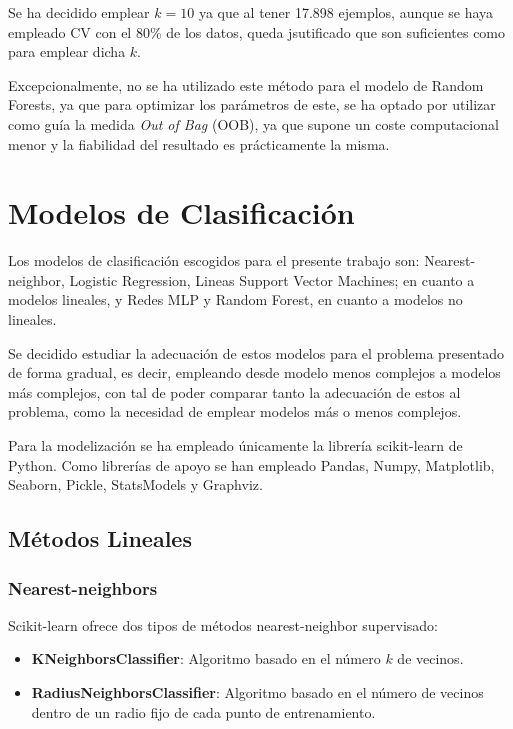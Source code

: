 \documentclass[a4paper]{article} %
\begin{document}
Se ha decidido emplear $k = 10$ ya que al tener 17.898 ejemplos, aunque se haya empleado CV con el 80\% de los datos, queda jsutificado que son suficientes como para emplear dicha $k$.\vspace{5mm}

Excepcionalmente, no se ha utilizado este método para el modelo de Random Forests, ya que para optimizar los parámetros de este, se ha optado por utilizar como guía la medida \textit{Out of Bag} (OOB), ya que supone un coste computacional menor y la fiabilidad del resultado es prácticamente la misma. 


\section{Modelos de Clasificación}

Los modelos de clasificación escogidos para el presente trabajo son: Nearest-neighbor, Logistic Regression, Lineas Support Vector Machines; en cuanto a modelos lineales, y Redes MLP y Random Forest, en cuanto a modelos no lineales.\vspace{5mm}

Se decidido estudiar la adecuación de estos modelos para el problema presentado de forma gradual, es decir, empleando desde modelo menos complejos a modelos más complejos, con tal de poder comparar tanto la adecuación de estos al problema, como la necesidad de emplear modelos más o menos complejos.\vspace{5mm}

Para la modelización se ha empleado únicamente la librería scikit-learn de Python. Como librerías de apoyo se han empleado Pandas, Numpy, Matplotlib, Seaborn, Pickle, StatsModels y Graphviz.

\subsection{Métodos Lineales}
\subsubsection{Nearest-neighbors}

Scikit-learn ofrece dos tipos de métodos nearest-neighbor supervisado:
\begin{itemize}
    \item \textbf{KNeighborsClassifier}: Algoritmo basado en el número $k$ de vecinos.
    \item \textbf{RadiusNeighborsClassifier}: Algoritmo basado en el número de vecinos dentro de un radio fijo de cada punto de entrenamiento.
\end{itemize}
\end{document}
